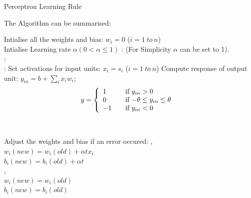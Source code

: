 \documentclass[a4paper,12pt]{report}
\begin{document}
\begin{algorithm}[h!]
\caption{Perceptron Learning Rule}
\label{Perceptron Learning Rule}
The Algorithm can be summarised\cite{bookann}:\\
\begin{algorithmic}[h!]
 \State Intialise all the weights and bias:
      \State\hspace{\algorithmicindent} $w_i = 0$ 	($i = 1\ to\ n$)\\
 \State Intialise Learning rate $\alpha (0 < \alpha \leq 1)$ :
      \State\hspace{\algorithmicindent} (For Simplicity $\alpha$ can be set to 1).\\
 :\\
 :
      \State Set activations for input units:
	    \State\hspace{\algorithmicindent} $x_i = s_i$	($i = 1\ to\  n$)
      \State Compute response of output unit:
	    \State\hspace{\algorithmicindent} $y_{in} = b + \sum\limits_i x_iw_i$;\\
	   \State \[ y = \left\{
		\begin{array}{l l}
		  1 & \quad \text{if $y_{in} > 0$}\\
		  0 & \quad \text{if $-\theta \leq y_{in} \leq \theta$}\\
		  -1 & \quad \text{if $y_{in} < 0$}
		\end{array} \right.\]\\ \\
      \State Adjust the weights and bias if an error occured:
	    ,\\
		\hspace{\algorithmicindent}\hspace{\algorithmicindent}\hspace{\algorithmicindent}$w_i(new) = w_i(old) + \alpha tx_i$ \\
		\hspace{\algorithmicindent}\hspace{\algorithmicindent}\hspace{\algorithmicindent}$b_i(new) = b_i(old) + \alpha t$ \\
	    \Else,\\
		\hspace{\algorithmicindent}\hspace{\algorithmicindent}\hspace{\algorithmicindent}$w_i(new) = w_i(old)$\\
		\hspace{\algorithmicindent}\hspace{\algorithmicindent}\hspace{\algorithmicindent}$b_i(new) = b_i(old)$\\
	    \EndIf
  \EndFor
 \EndWhile
\end{algorithmic}
\end{algorithm}
\clearpage
\end{document}
